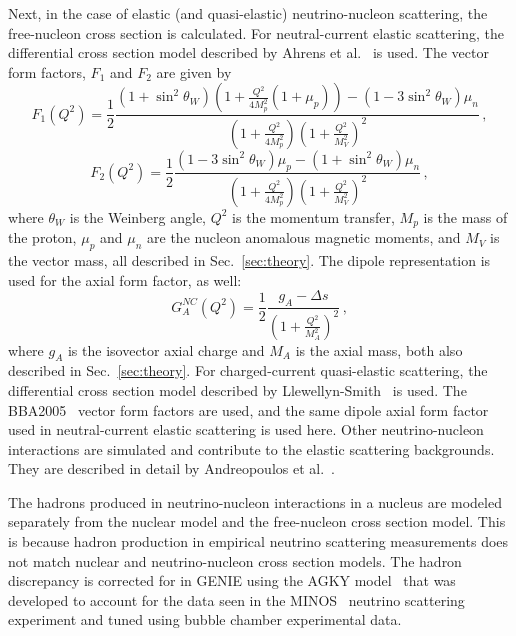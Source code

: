     Next, in the case of elastic (and quasi-elastic) neutrino-nucleon
    scattering, the free-nucleon cross section is calculated. For
    neutral-current elastic scattering, the differential cross section model
    described by Ahrens et al.~\cite{Ahrens} is used. The vector form
    factors, $F_1$ and $F_2$ are given by
    \begin{equation}
      F_1(Q^2) = \frac{1}{2}\frac{(1+\sin^2\theta_W)(1+\frac{Q^2}{4M_p^2}(1+\mu_p)) 
        - (1-3\sin^2\theta_W)\mu_n}
        {(1+\frac{Q^2}{4M_p^2})(1+\frac{Q^2}{M_V^2})^2} \,,
    \end{equation}
    \begin{equation}
      F_2(Q^2) = \frac{1}{2}\frac{(1-3\sin^2\theta_W)\mu_p - (1+\sin^2\theta_W)\mu_n}
         {(1+\frac{Q^2}{4M_p^2})(1+\frac{Q^2}{M_V^2})^2} \,,
    \end{equation}
    where $\theta_W$ is the Weinberg angle, $Q^2$ is the momentum transfer,
    $M_p$ is the mass of the proton, $\mu_p$ and $\mu_n$ are the nucleon
    anomalous magnetic moments, and $M_V$ is the vector mass, all described in
    Sec.~\ref{sec:theory}. The dipole representation is used for the axial
    form factor, as well:
    \begin{equation}
      G_A^{NC}(Q^2) = \frac{1}{2}\frac{g_A - \Delta s}{(1+\frac{Q^2}{M_A^2})^2} \,,
    \end{equation}
    where $g_A$ is the isovector axial charge and $M_A$ is the axial mass, both
    also described in Sec.~\ref{sec:theory}. For charged-current quasi-elastic
    scattering, the differential cross section model described by
    Llewellyn-Smith~\cite{Llewellyn} is used. The BBA2005~\cite{BBA05} vector
    form factors are used, and the same dipole axial form factor used in
    neutral-current elastic scattering is used here. Other neutrino-nucleon
    interactions are simulated and contribute to the elastic scattering
    backgrounds. They are described in detail by Andreopoulos et
    al.~\cite{Andreopoulos:2015wxa}.

    The hadrons produced in neutrino-nucleon interactions in a nucleus are
    modeled separately from the nuclear model and the free-nucleon cross
    section model. This is because hadron production in empirical neutrino
    scattering measurements does not match nuclear and neutrino-nucleon cross
    section models. The hadron discrepancy is corrected for in GENIE using the
    AGKY model~\cite{AGKY} that was developed to account for the data seen in
    the MINOS~\cite{MINOS} neutrino scattering experiment and tuned using
    bubble chamber experimental data.

